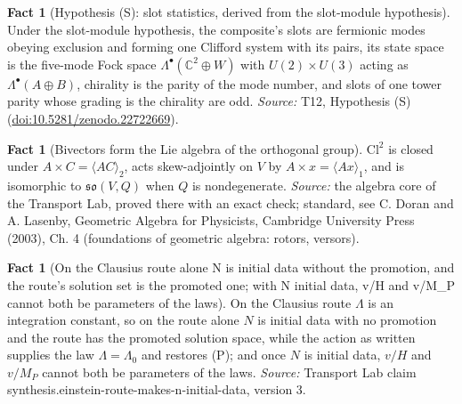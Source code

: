 \documentclass[11pt]{article}
\theoremstyle{definition}
\newtheorem{fact}[theorem]{Fact}
\theoremstyle{plain}
\newcommand{\changedmark}[2]{\marginpar{\raggedright\scriptsize\color{#1}#2}}
\providecommand{\C}{}\renewcommand{\C}{\mathbb{C}}
\providecommand{\Cl}{}\renewcommand{\Cl}{\mathrm{Cl}}
\providecommand{\so}{}\renewcommand{\so}{\mathfrak{so}}
\begin{document}
\begin{fact}[Hypothesis (S): slot statistics, derived from the slot-module hypothesis]\label{c:standard-model.hyp-s-slot-statistics}
\changedmark{BurntOrange}{changed since the deposit}
Under the slot-module hypothesis, the composite's slots are fermionic modes obeying exclusion and forming one Clifford system with its pairs, its state space is the five-mode Fock space $\Lambda^{\bullet}(\C^{2} \oplus W)$ with $U(2) \times U(3)$ acting as $\Lambda^{\bullet}(A \oplus B)$, chirality is the parity of the mode number, and slots of one tower parity whose grading is the chirality are odd.
\emph{Source:} T12, Hypothesis (S) (\href{https://doi.org/10.5281/zenodo.22722669}{doi:10.5281/zenodo.22722669}).
\end{fact}

\begin{fact}[Bivectors form the Lie algebra of the orthogonal group]\label{c:std-algebra.bivector-lie-algebra}
$\Cl^{2}$ is closed under $A \times C = \langle AC \rangle_2$, acts skew-adjointly on $V$ by $A \times x = \langle Ax \rangle_1$, and is isomorphic to $\so(V,Q)$ when $Q$ is nondegenerate.
\emph{Source:} the algebra core of the Transport Lab, proved there with an exact check; standard, see C. Doran and A. Lasenby, Geometric Algebra for Physicists, Cambridge University Press (2003), Ch. 4 (foundations of geometric algebra: rotors, versors).
\end{fact}

\begin{fact}[On the Clausius route alone N is initial data without the promotion, and the route's solution set is the promoted one; with N initial data, v/H and v/M\_P cannot both be parameters of the laws]\label{c:synthesis.einstein-route-makes-n-initial-data}
On the Clausius route $\Lambda$ is an integration constant, so on the route alone $N$ is initial data with no promotion and the route has the promoted solution space, while the action as written supplies the law $\Lambda = \Lambda_{0}$ and restores (P); and once $N$ is initial data, $v/H$ and $v/M_{P}$ cannot both be parameters of the laws.
\emph{Source:} Transport Lab claim synthesis.einstein-route-makes-n-initial-data, version 3.
\end{fact}
\end{document}
